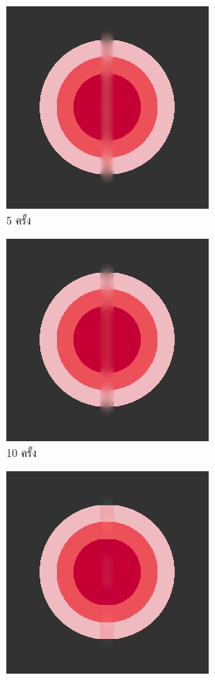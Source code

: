 \documentclass[hidelinks, a4paper,12pt]{article}
\numberwithin{equation}{section}							%
\numberwithin{equation}{section}
\begin{document}
{	\begin{figure}[H]
		\centering
		\begin{subfigure}{0.4\linewidth}
			\centering
			\includegraphics[width=0.7\linewidth]{images/just10enough/only5time.png}
			\caption{5 ครั้ง}
		\end{subfigure}
		\begin{subfigure}{0.4\linewidth}
			\centering
			\includegraphics[width=0.7\linewidth]{images/just10enough/only10time.png}
			\caption{10 ครั้ง}
		\end{subfigure}
		\begin{subfigure}{0.4\linewidth}
			\centering
			\includegraphics[width=0.7\linewidth]{images/just10enough/only50time.png}			

\end{subfigure}
\end{figure}}
\end{document}
